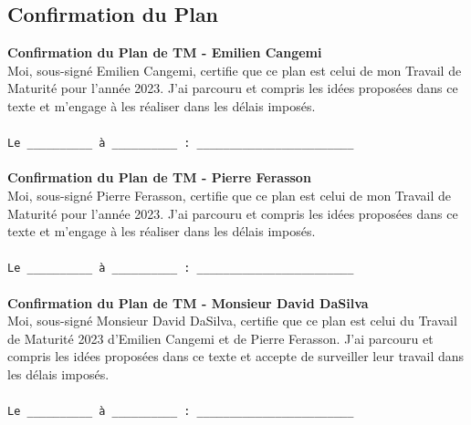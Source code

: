\documentclass{article}
\begin{document}
    \subsection{Confirmation du Plan}
    
        \textbf{Confirmation du Plan de TM - Emilien Cangemi} \\
        Moi, sous-signé Emilien Cangemi, certifie que ce plan est celui de mon Travail de Maturité pour l'année 2023. J'ai parcouru et compris les idées proposées dans ce texte et m'engage à les réaliser dans les délais imposés.\\ \\
            {\texttt{Le \_\_\_\_\_\_\_\_\_\_ à \_\_\_\_\_\_\_\_\_\_ : \_\_\_\_\_\_\_\_\_\_\_\_\_\_\_\_\_\_\_\_\_\_\_\_} \\} \\

        \textbf{Confirmation du Plan de TM - Pierre Ferasson} \\
        Moi, sous-signé Pierre Ferasson, certifie que ce plan est celui de mon Travail de Maturité pour l'année 2023. J'ai parcouru et compris les idées proposées dans ce texte et m'engage à les réaliser dans les délais imposés.\\ \\
            {\texttt{Le \_\_\_\_\_\_\_\_\_\_ à \_\_\_\_\_\_\_\_\_\_ : \_\_\_\_\_\_\_\_\_\_\_\_\_\_\_\_\_\_\_\_\_\_\_\_} \\} \\

        \textbf{Confirmation du Plan de TM - Monsieur David DaSilva} \\
        Moi, sous-signé Monsieur David DaSilva, certifie que ce plan est celui du Travail de Maturité 2023 d'Emilien Cangemi et de Pierre Ferasson. J'ai parcouru et compris les idées proposées dans ce texte et accepte de surveiller leur travail dans les délais imposés.\\ \\
            {\texttt{Le \_\_\_\_\_\_\_\_\_\_ à \_\_\_\_\_\_\_\_\_\_ : \_\_\_\_\_\_\_\_\_\_\_\_\_\_\_\_\_\_\_\_\_\_\_\_}}
         
\end{document}
